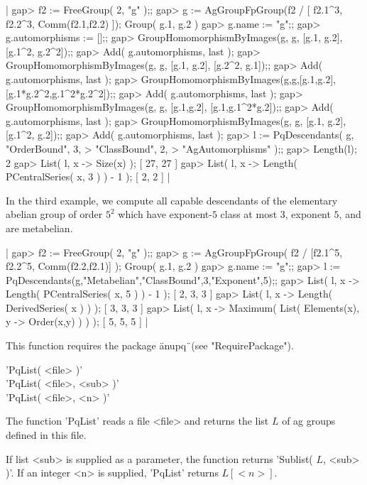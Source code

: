 |    gap> f2 := FreeGroup( 2, "g" );;
    gap> g := AgGroupFpGroup(f2 / [ f2.1^3, f2.2^3, Comm(f2.1,f2.2) ]);
    Group( g.1, g.2 )
    gap> g.name := "g";;
    gap> g.automorphisms := [];;
    gap> GroupHomomorphismByImages(g, g, [g.1, g.2], [g.1^2, g.2^2]);;
    gap> Add( g.automorphisms, last );
    gap> GroupHomomorphismByImages(g, g, [g.1, g.2], [g.2^2, g.1]);;
    gap> Add( g.automorphisms, last );
    gap> GroupHomomorphismByImages(g,g,[g.1,g.2],[g.1*g.2^2,g.1^2*g.2^2]);;
    gap> Add( g.automorphisms, last );
    gap> GroupHomomorphismByImages(g, g, [g.1,g.2], [g.1,g.1^2*g.2]);;
    gap> Add( g.automorphisms, last );
    gap> GroupHomomorphismByImages(g, g, [g.1, g.2], [g.1^2, g.2]);;
    gap> Add( g.automorphisms, last );
    gap> l := PqDescendants( g, "OrderBound", 3,
    >                           "ClassBound", 2,
    >                           "AgAutomorphisms" );;
    gap> Length(l);
    2
    gap> List( l, x -> Size(x) );
    [ 27, 27 ]
    gap> List( l, x -> Length( PCentralSeries( x, 3 ) ) - 1 );
    [ 2, 2 ] |

In  the  third  example,  we  compute  all  capable  descendants  of  the
elementary abelian group of order  $5^2$ which have exponent-$5$ class at
most $3$, exponent $5$, and are metabelian.

|    gap> f2 := FreeGroup( 2, "g" );;
    gap> g := AgGroupFpGroup( f2 / [f2.1^5, f2.2^5, Comm(f2.2,f2.1)] );
    Group( g.1, g.2 )
    gap> g.name := "g";;
    gap> l := PqDescendants(g,"Metabelian","ClassBound",3,"Exponent",5);;
    gap> List( l, x -> Length( PCentralSeries( x, 5 ) ) - 1 );
    [ 2, 3, 3 ]
    gap> List( l, x -> Length( DerivedSeries( x ) ) );
    [ 3, 3, 3 ]
    gap> List( l, x -> Maximum( List( Elements(x), y -> Order(x,y) ) ) );
    [ 5, 5, 5 ] |

This function requires the package \"anupq\"\ (see "RequirePackage").


'PqList( <file> )' \\
'PqList( <file>, <sub> )' \\
'PqList( <file>, <n> )'

The function 'PqList' reads a file  <file> and returns the list $L$ of ag
groups defined in this file.

If list <sub> is supplied as a parameter, the function  returns 'Sublist(
$L$, <sub> )'.  If an integer <n> is supplied, 'PqList' returns $L[<n>]$.

